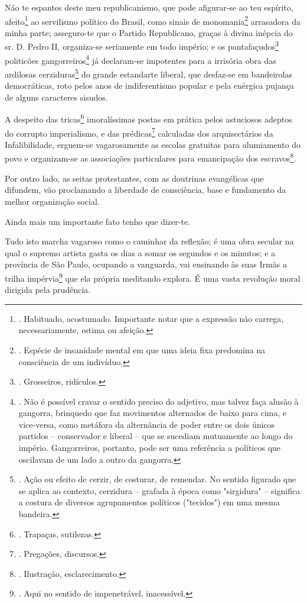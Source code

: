 Não te espantes deste meu republicanismo, que pode afigurar-se ao teu
espírito, afeito\footnote{. Habituado, acostumado. Importante notar que
  a expressão não carrega, necessariamente, estima ou afeição.} ao
servilismo político do Brasil, como sinais de {monomania}\footnote{.
  Espécie de insanidade mental em que uma ideia fixa predomina na
  consciência de um indivíduo.} {arrasadora} da minha parte; asseguro-te
que o Partido Republicano, graças à divina inépcia do sr. D. Pedro II,
organiza-se seriamente em todo império; e os pantafaçudos\footnote{.
  Grosseiros, ridículos.} politicões gangorreiros\footnote{. Não é
  possível cravar o sentido preciso do adjetivo, mas talvez faça alusão
  à gangorra, brinquedo que faz movimentos alternados de baixo para
  cima, e vice-versa, como metáfora da alternância de poder entre os
  dois únicos partidos -- conservador e liberal -- que se sucediam
  mutuamente ao longo do império. Gangorreiros, portanto, pode ser uma
  referência a políticos que oscilavam de um lado a outro da gangorra.}
já declaram-se impotentes para a irrisória obra das ardilosas
cerziduras\footnote{. Ação ou efeito de cerzir, de costurar, de
  remendar. No sentido figurado que se aplica ao contexto, cerzidura --
  grafada à época como "sirgidura" -- significa a costura de diversos
  agrupamentos políticos ("tecidos") em uma mesma bandeira.} do g{rande
estandarte liberal}, que desfaz-se em bandeirolas democráticas, roto
pelos anos de indiferentismo popular e pela enérgica pujança de alguns
caracteres sisudos.

A despeito das tricas\footnote{. Trapaças, sutilezas.} imoralíssimas
postas em prática pelos astuciosos adeptos do corrupto imperialismo, e
das prédicas\footnote{. Pregações, discursos.} calculadas dos
arquisectários da {Infalibilidade}, erguem-se vagarosamente as escolas
gratuitas para alumiamento do povo e organizam-se as associações
particulares para emancipação dos escravos\footnote{. Ilustração,
  esclarecimento.}.

Por outro lado, as seitas protestantes, com as doutrinas evangélicas que
difundem, vão proclamando a liberdade de consciência, base e fundamento
da melhor organização social.

Ainda mais um importante fato tenho que dizer-te.

Tudo isto marcha vagaroso como o caminhar da reflexão; é uma obra
secular na qual o {supremo artista} gasta os dias a somar os segundos e
os minutos; e a província de São Paulo, ocupando a vanguarda, vai
ensinando às suas Irmãs a trilha impérvia\footnote{. Aqui no sentido de
  impenetrável, inacessível.} que ela própria meditando explora. É uma
vasta revolução moral dirigida pela prudência.

